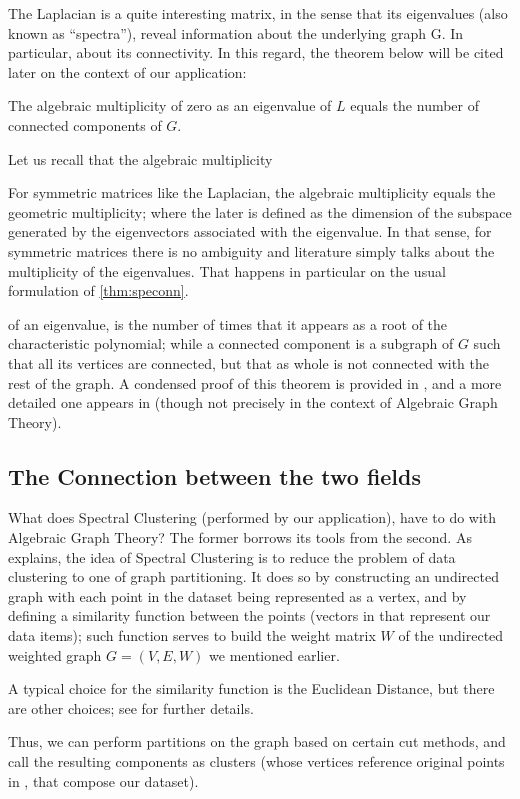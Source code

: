 The Laplacian is a quite interesting matrix, in the sense that its
eigenvalues (also known as ``spectra''), reveal information about the
underlying graph G. In particular, about its connectivity. In this
regard, the theorem below will be cited later on the context of our
application: 

\begin{theorem}
  \label{thm:speconn}
  The algebraic multiplicity of zero as an eigenvalue of $L$ equals
  the number of connected components of $G$.
\end{theorem}
\hfill

Let us recall that the algebraic multiplicity \begin{footnote}For
  symmetric matrices like the Laplacian, the algebraic multiplicity
  equals the geometric multiplicity; where the later is defined as the
  dimension of the subspace generated by the eigenvectors associated
  with the eigenvalue. In that sense, for symmetric matrices there is
  no ambiguity and literature simply talks about the multiplicity of
  the eigenvalues. That happens in particular on the usual formulation
  of \cref{thm:speconn}.
  \end{footnote} of an eigenvalue, is the
number of times that it appears as a root of the characteristic
polynomial; while a connected component is a subgraph of
$G$ such that all its vertices are connected, but that as whole is not
connected with the rest of the graph. 
A condensed proof of this theorem is provided in
\cite{brouwer}, and a more detailed one appears in \cite{luxburg07}
(though not precisely in the context of Algebraic Graph Theory). \\

\subsection{The Connection between the two fields}

What does Spectral Clustering (performed by our application), have to
do with Algebraic Graph Theory? The former borrows its tools from the
second. As \cite{jia14} explains, the idea of Spectral Clustering is
to reduce the problem of data clustering to one of graph
partitioning. It does so by constructing an undirected graph with each
point in the dataset being represented as a vertex, and by defining a
similarity function 
between the points (vectors in  that represent our data items); such
function serves to build the weight matrix $W$ of the undirected weighted graph
$G = (V,E,W)$ we mentioned earlier. \begin{footnote}A typical choice
  for the similarity function is the Euclidean Distance, but there are
  other choices; see \cite{luxburg07} for further
  details.\end{footnote} Thus, we can perform partitions on the graph
based on certain cut methods, and call the resulting components as
clusters (whose vertices reference original points in , that
compose our dataset). \\


